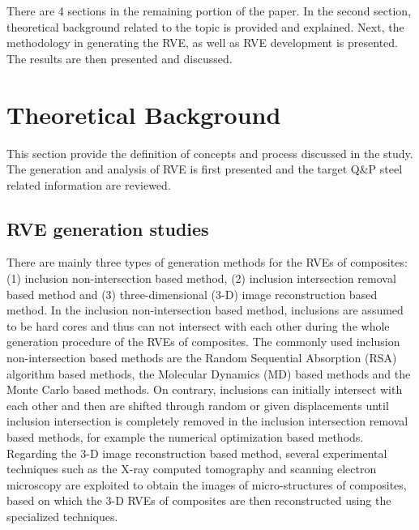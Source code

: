 There are 4 sections in the remaining portion of the paper. In the second section, theoretical background related to the topic is provided and explained. Next, the methodology in generating the RVE, as well as RVE development is presented. The results are then presented and discussed.

 

\chapter{Theoretical Background}

This section provide the definition of concepts and process discussed in the study. The generation and analysis of RVE is first presented and the target Q\&P steel related information are reviewed.

\section{RVE generation studies}

There are mainly three types of generation methods for the RVEs of composites: (1) inclusion non-intersection based method, (2) inclusion intersection removal based method and (3) three-dimensional (3-D) image reconstruction based method. In the inclusion non-intersection based method, inclusions are assumed to be hard cores and thus can not intersect with each other during the whole generation procedure of the RVEs of composites. The commonly used inclusion non-intersection based methods are the Random Sequential Absorption (RSA) algorithm based methods, the Molecular Dynamics (MD) based methods and the Monte Carlo based methods. On contrary, inclusions can initially intersect with each other and then are shifted through random or given displacements until inclusion intersection is completely removed in the inclusion intersection removal based methods, for example the numerical optimization based methods. Regarding the 3-D image reconstruction based method, several experimental techniques such as the X-ray computed tomography and scanning electron microscopy are exploited to obtain the images of micro-structures of composites, based on which the 3-D RVEs of composites are then reconstructed using the specialized techniques.

